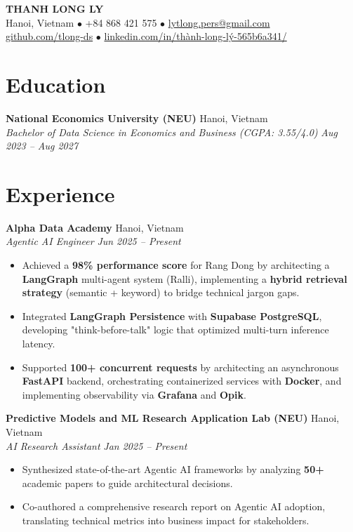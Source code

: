 \documentclass[10pt, a4paper]{article}
\newcommand{\entryheader}[4]{
    \noindent\textbf{#1} \hfill #2 \\
    \textit{#3} \hfill \textit{#4} \par
}
\begin{document}
\pagestyle{empty}

\begin{center}
    {\LARGE \textbf{THANH LONG LY}} \\
    \vspace{1pt}
    Hanoi, Vietnam $\bullet$ +84 868 421 575 $\bullet$ \href{mailto:lytlong.pers@gmail.com}{lytlong.pers@gmail.com} \\
    \href{https://github.com/tlong-ds}{github.com/tlong-ds} $\bullet$ \href{https://www.linkedin.com/in/thành-long-lý-565b6a341/}{linkedin.com/in/thành-long-lý-565b6a341/}
\end{center}

\section{Education}
\entryheader{National Economics University (NEU)}{Hanoi, Vietnam}{Bachelor of Data Science in Economics and Business (CGPA: 3.55/4.0)}{Aug 2023 -- Aug 2027}

\section{Experience}
\entryheader{Alpha Data Academy}{Hanoi, Vietnam}{Agentic AI Engineer}{Jun 2025 -- Present}
\begin{itemize}
    \item Achieved a \textbf{98\% performance score} for Rang Dong by architecting a \textbf{LangGraph} multi-agent system (Ralli), implementing a \textbf{hybrid retrieval strategy} (semantic + keyword) to bridge technical jargon gaps.
    \item Integrated \textbf{LangGraph Persistence} with \textbf{Supabase PostgreSQL}, developing "think-before-talk" logic that optimized multi-turn inference latency.
    \item Supported \textbf{100+ concurrent requests} by architecting an asynchronous \textbf{FastAPI} backend, orchestrating containerized services with \textbf{Docker}, and implementing observability via \textbf{Grafana} and \textbf{Opik}.
\end{itemize}

\vspace{3pt}
\entryheader{Predictive Models and ML Research Application Lab (NEU)}{Hanoi, Vietnam}{AI Research Assistant}{Jan 2025 -- Present}
\begin{itemize}
    \item Synthesized state-of-the-art Agentic AI frameworks by analyzing \textbf{50+} academic papers to guide architectural decisions.
    \item Co-authored a comprehensive research report on Agentic AI adoption, translating technical metrics into business impact for stakeholders.
\end{itemize}
\end{document}
